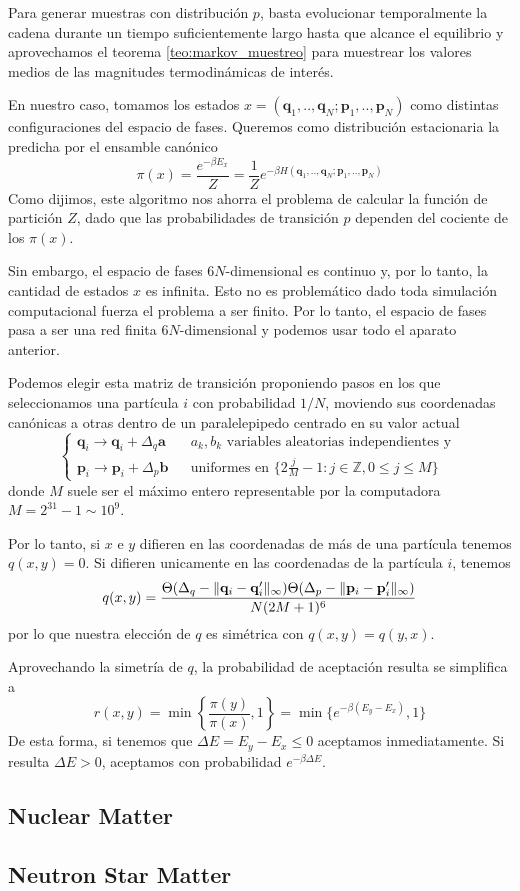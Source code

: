Para generar muestras con distribución $p$, basta evolucionar temporalmente la cadena durante un tiempo suficientemente largo hasta que alcance el equilibrio y
aprovechamos el teorema \ref{teo:markov_muestreo} para muestrear los valores medios de las magnitudes termodinámicas de interés.

En nuestro caso, tomamos los estados $x = (\mathbf{q}_1,..,\mathbf{q}_N;\mathbf{p}_1,..,\mathbf{p}_N)$ como distintas configuraciones del espacio de fases.
Queremos como distribución estacionaria la predicha por el ensamble canónico \[\pi(x) = \frac{e^{-\beta E_x}}{Z} = \frac{1}{Z}e^{-\beta H(\mathbf{q}_1,..,\mathbf{q}_N;\mathbf{p}_1,..,\mathbf{p}_N)}\]
Como dijimos, este algoritmo nos ahorra el problema de calcular la función de partición $Z$, dado que las probabilidades de transición $p$ dependen del cociente de los $\pi(x)$.

Sin embargo, el espacio de fases $6N$-dimensional es continuo y, por lo tanto, la cantidad de estados $x$ es infinita.
Esto no es problemático dado toda simulación computacional fuerza el problema a ser finito.
Por lo tanto, el espacio de fases pasa a ser una red finita $6N$-dimensional y podemos usar todo el aparato anterior.

Podemos elegir esta matriz de transición proponiendo pasos en los que seleccionamos una partícula $i$ con probabilidad $1/N$, moviendo sus coordenadas canónicas a otras dentro de un paralelepipedo
centrado en su valor actual
\[
\left\{\begin{matrix}
\mathbf{q}_i \to  \mathbf{q}_i + \Delta_q \mathbf{a} & & a_k,b_k \text{ variables aleatorias independientes y }  \\
\mathbf{p}_i \to  \mathbf{p}_i + \Delta_p \mathbf{b} & &  \text{uniformes en } \{2\frac{j}{M}-1: j\in\mathbb{Z}, 0 \leq j \leq M\}
\end{matrix}\right.\]
donde $M$ suele ser el máximo entero representable por la computadora $M = 2^{31}-1\sim 10^9$.

Por lo tanto, si $x$ e $y$ difieren en las coordenadas de más de una partícula tenemos $q(x,y)=0$.
Si difieren unicamente en las coordenadas de la partícula $i$, tenemos
\[q(x,y) = \frac{\Theta(\Delta_q - \Arrowvert \mathbf{q}_i - \mathbf{q}_i' \Arrowvert_\infty)\Theta(\Delta_p - \Arrowvert \mathbf{p}_i - \mathbf{p}_i' \Arrowvert_\infty)}{N(2M+1)^6}\]
por lo que nuestra elección de $q$ es simétrica con $q(x,y) = q(y,x)$.

Aprovechando la simetría de $q$, la probabilidad de aceptación resulta se simplifica a
\[r(x,y) = \min\left\{\frac{\pi(y)}{\pi(x)}, 1\right\} = \min\{e^{-\beta(E_y-E_x)}, 1\}\]
De esta forma, si tenemos que $\Delta E = E_y - E_x \leq 0$ aceptamos inmediatamente. Si resulta $\Delta E > 0$, aceptamos con probabilidad $e^{-\beta\Delta E}$.


\subsection{Nuclear Matter}{\label{sec:intro_NM}}

\subsection{Neutron Star Matter}
